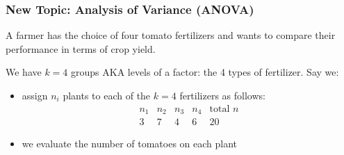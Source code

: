 \documentclass[handout]{beamer}
\newcommand{\blue}[1]{\textcolor{blue2}{#1}}
\begin{document}
\begin{frame}[fragile]
\frametitle{New Topic: Analysis of Variance (ANOVA)}
A farmer has the choice of four tomato fertilizers and wants to compare their performance in terms of crop yield.

\pause \vspace{0.5cm}

We have $k=4$ groups AKA \blue{levels of a factor}: the 4 types of fertilizer.  \pause Say we:
\begin{itemize}
\pause \item assign $n_i$ plants to each of the $k=4$ fertilizers as follows:
\[
\begin{array}{cccc|c}
n_1 & n_2 & n_3 & n_4 &\mbox{total }n\\
\hline
3 & 7 & 4 & 6 & 20
\end{array}
\]
\pause \item we evaluate the number of tomatoes on each plant
\end{itemize}

\end{frame}


%
%
\end{document}
